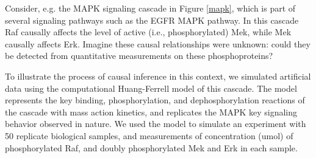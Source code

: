\documentclass[journal=jacsat,manuscript=article]{achemso}
\begin{document}
Consider, e.g. the MAPK signaling cascade in Figure \ref{mapk}, which is part of several signaling pathways such as the EGFR MAPK pathway\cite{holbro2004erbb}. In this cascade Raf causally affects the level of active (i.e., phosphorylated) Mek, while Mek causally affects Erk. Imagine these causal relationships were unknown: could they be detected from quantitative measurements on these phosphoproteins?  

To illustrate the process of causal inference in this context, we simulated artificial data using the computational Huang-Ferrell model \cite{huang1996ultrasensitivity} of this cascade. The model represents the key binding, phosphorylation, and dephosphorylation reactions of the cascade with mass action kinetics, and replicates the MAPK key signaling behavior observed in nature.  We used the model to simulate an experiment with 50 replicate biological samples, and measurements of concentration (umol) of phosphorylated Raf, and doubly phosphorylated Mek and Erk in each sample. 
\end{document}
